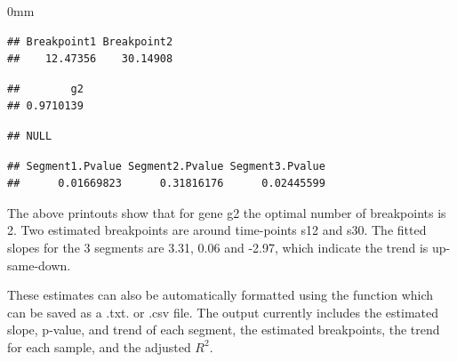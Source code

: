 \documentclass{article}
\begin{document}
\begin{knitrout}
\begin{adjustwidth}{\fltoffset}{0mm}
\end{adjustwidth}\begin{kframe}\begin{alltt}
\hlopt{$}\hlstd{Breakpoints[}\hlstd{,]} 
\end{alltt}
\begin{verbatim}
## Breakpoint1 Breakpoint2 
##    12.47356    30.14908
\end{verbatim}
\begin{alltt}
\hlopt{$}\hlstd{AdjustedR2[}\hlstd{]} 
\end{alltt}
\begin{verbatim}
##        g2 
## 0.9710139
\end{verbatim}
\begin{alltt}
\hlopt{$}\hlstd{Segments[}\hlstd{,]} 
\end{alltt}
\begin{verbatim}
## NULL
\end{verbatim}
\begin{alltt}
\hlopt{$}\hlstd{Segment.Pvalues[}\hlstd{,]} 
\end{alltt}
\begin{verbatim}
## Segment1.Pvalue Segment2.Pvalue Segment3.Pvalue 
##      0.01669823      0.31816176      0.02445599
\end{verbatim}
\end{kframe}
\end{knitrout}

The above printouts show that for gene g2 the optimal number of breakpoints
is 2. Two estimated breakpoints are around time-points s12 and s30.
The fitted slopes for the 3 segments are 3.31, 0.06 and -2.97, which indicate 
the trend is up-same-down.


These estimates can also be automatically formatted using the function 
which can be saved as a .txt. or .csv file. The output currently includes the 
estimated slope, p-value, and trend of
each segment, the estimated breakpoints, the trend for each sample, and the 
adjusted $R^2$.
\end{document}
